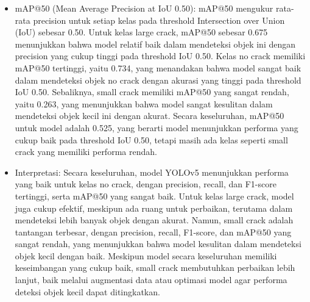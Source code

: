 \documentclass[12pt,a4paper]{article}
\begin{document}
\begin{adjustwidth}{3em}{0pt}
\begin{itemize}
    \item mAP@50 (Mean Average Precision at IoU 0.50):
    mAP@50 mengukur rata-rata precision untuk setiap kelas pada threshold Intersection over Union (IoU) sebesar 0.50. Untuk kelas large crack, mAP@50 sebesar 0.675 menunjukkan bahwa model relatif baik dalam mendeteksi objek ini dengan precision yang cukup tinggi pada threshold IoU 0.50. Kelas no crack memiliki mAP@50 tertinggi, yaitu 0.734, yang menandakan bahwa model sangat baik dalam mendeteksi objek no crack dengan akurasi yang tinggi pada threshold IoU 0.50. Sebaliknya, small crack memiliki mAP@50 yang sangat rendah, yaitu 0.263, yang menunjukkan bahwa model sangat kesulitan dalam mendeteksi objek kecil ini dengan akurat. Secara keseluruhan, mAP@50 untuk model adalah 0.525, yang berarti model menunjukkan performa yang cukup baik pada threshold IoU 0.50, tetapi masih ada kelas seperti small crack yang memiliki performa rendah.
    
    \item Interpretasi: Secara keseluruhan, model YOLOv5 menunjukkan performa yang baik untuk kelas no crack, dengan precision, recall, dan F1-score tertinggi, serta mAP@50 yang sangat baik. Untuk kelas large crack, model juga cukup efektif, meskipun ada ruang untuk perbaikan, terutama dalam mendeteksi lebih banyak objek dengan akurat. Namun, small crack adalah tantangan terbesar, dengan precision, recall, F1-score, dan mAP@50 yang sangat rendah, yang menunjukkan bahwa model kesulitan dalam mendeteksi objek kecil dengan baik. Meskipun model secara keseluruhan memiliki keseimbangan yang cukup baik, small crack membutuhkan perbaikan lebih lanjut, baik melalui augmentasi data atau optimasi model agar performa deteksi objek kecil dapat ditingkatkan.
\end{itemize}
\end{adjustwidth}
\end{document}
